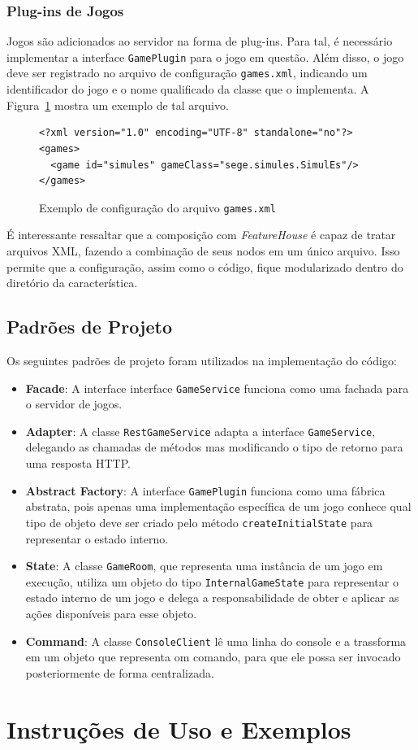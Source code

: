 \documentclass[12pt]{article}
\begin{document}
\subsubsection{Plug-ins de Jogos}

Jogos são adicionados ao servidor na forma de plug-ins. Para tal, é necessário implementar a interface \texttt{GamePlugin} para o jogo em questão. Além disso, o jogo deve ser registrado no arquivo de configuração \texttt{games.xml}, indicando um identificador do jogo e o nome qualificado da classe que o implementa. A Figura~\ref{img:gamesxml} mostra um exemplo de tal arquivo.

\begin{figure}[htb]
\centering
\footnotesize
\begin{verbatim}
<?xml version="1.0" encoding="UTF-8" standalone="no"?>
<games>
  <game id="simules" gameClass="sege.simules.SimulEs"/>
</games>
\end{verbatim}
\caption{Exemplo de configuração do arquivo \texttt{games.xml}}
\label{img:gamesxml}
\end{figure}

É interessante ressaltar que a composição com \emph{FeatureHouse} é capaz de tratar arquivos XML, fazendo a combinação de seus nodos em um único arquivo. Isso permite que a configuração, assim como o código, fique modularizado dentro do diretório da característica.

\subsection{Padrões de Projeto}

Os seguintes padrões de projeto foram utilizados na implementação do código:
\begin{itemize}
\item \textbf{Facade}: A interface interface \texttt{GameService} funciona como uma fachada para o servidor de jogos.
\item \textbf{Adapter}: A classe \texttt{RestGameService} adapta a interface \texttt{GameService}, delegando as chamadas de métodos mas modificando o tipo de retorno para uma resposta HTTP.
\item \textbf{Abstract Factory}: A interface \texttt{GamePlugin} funciona como uma fábrica abstrata, pois apenas uma implementação específica de um jogo conhece qual tipo de objeto deve ser criado pelo método \texttt{createInitialState} para representar o estado interno.
\item \textbf{State}: A classe \texttt{GameRoom}, que representa uma instância de um jogo em execução, utiliza um objeto do tipo \texttt{InternalGameState} para representar o estado interno de um jogo e delega a responsabilidade de obter e aplicar as ações disponíveis para esse objeto.
\item \textbf{Command}: A classe \texttt{ConsoleClient} lê uma linha do console e a trassforma em um objeto que representa om comando, para que ele possa ser invocado posteriormente de forma centralizada.
\end{itemize}

\section{Instruções de Uso e Exemplos}
\label{sec:examples}



\FloatBarrier


\end{document}
